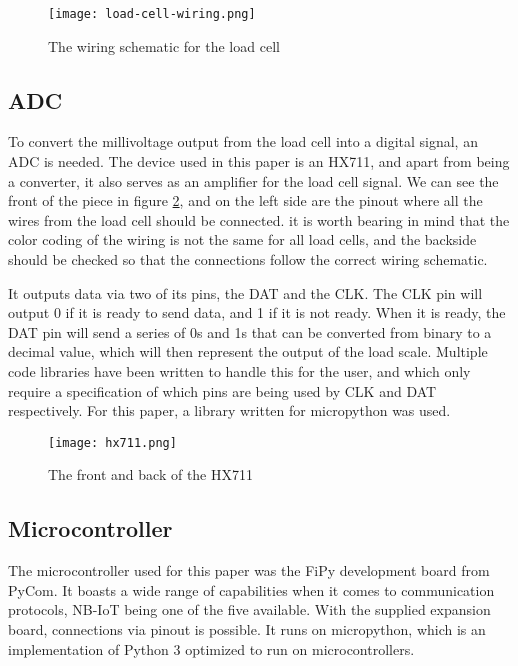 \begin{figure}[h]
	\centering
	\texttt{[image: load-cell-wiring.png]}
	\caption{The wiring schematic for the load cell}
	\label{fig:wiring}
\end{figure}


\subsection{ADC}
To convert the millivoltage output from the load cell into a digital signal, an ADC is needed. The device used in this paper is an HX711, and apart from being a converter, it also serves as an amplifier for the load cell signal. We can see the front of the piece in figure \ref{fig:hx711}, and on the left side are the pinout where all the wires from the load cell should be connected. it is worth bearing in mind that the color coding of the wiring is not the same for all load cells, and the backside should be checked so that the connections follow the correct wiring schematic. 

It outputs data via two of its pins, the DAT and the CLK. The CLK pin will output 0 if it is ready to send data, and 1 if it is not ready. When it is ready, the DAT pin will send  a series of 0s and 1s that can be converted from binary to a decimal value, which will then represent the output of the load scale.\cite{hx711-datasheet} Multiple code libraries have been written to handle this for the user, and which only require a specification of which pins are being used by CLK and DAT respectively. For this paper, a library written for micropython was used.\cite{hx711-lopy}

\begin{figure}[h]
	\centering
	\texttt{[image: hx711.png]}
	\caption{The front and back of the HX711}
	\label{fig:hx711}
\end{figure}


\subsection{Microcontroller}
The microcontroller used for this paper was the FiPy development board from PyCom. It boasts a wide range of capabilities when it comes to communication protocols, NB-IoT being one of the five available.\cite{fipy-docs} With the supplied expansion board, connections via pinout is possible. It runs on micropython, which is an implementation of Python 3 optimized to run on microcontrollers.\cite{micropython}


